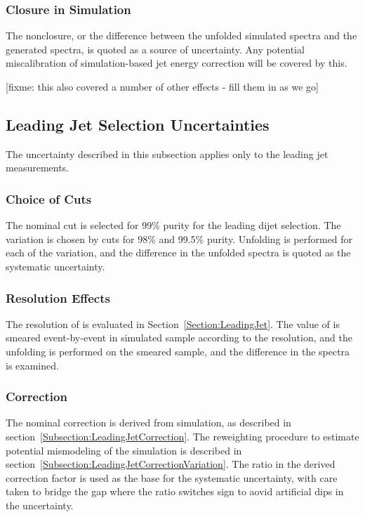 \subsubsection{Closure in Simulation}

The nonclosure, or the difference between the unfolded simulated spectra and the generated spectra, is quoted as a source of uncertainty.  Any potential miscalibration of simulation-based jet energy correction will be covered by this.

[fixme: this also covered a number of other effects - fill them in as we go]


\subsection{Leading Jet Selection Uncertainties}

The uncertainty described in this subsection applies only to the leading jet measurements.

\subsubsection{Choice of Cuts}

The nominal cut is selected for 99\% purity for the leading dijet selection.  The variation is chosen by cuts for 98\% and 99.5\% purity.  Unfolding is performed for each of the variation, and the difference in the unfolded spectra is quoted as the systematic uncertainty.


\subsubsection{Resolution Effects}

The resolution of \HybridE is evaluated in Section~\ref{Section:LeadingJet}.  The value of \HybridE is smeared event-by-event in simulated sample according to the resolution, and the unfolding is performed on the smeared sample, and the difference in the spectra is examined.


\subsubsection{Correction}

The nominal correction is derived from simulation, as described in section~\ref{Subsection:LeadingJetCorrection}.  The reweighting procedure to estimate potential mismodeling of the simulation is described in section~\ref{Subsection:LeadingJetCorrectionVariation}.  The ratio in the derived correction factor is used as the base for the systematic uncertainty, with care taken to bridge the gap where the ratio switches sign to aovid artificial dips in the uncertainty.


